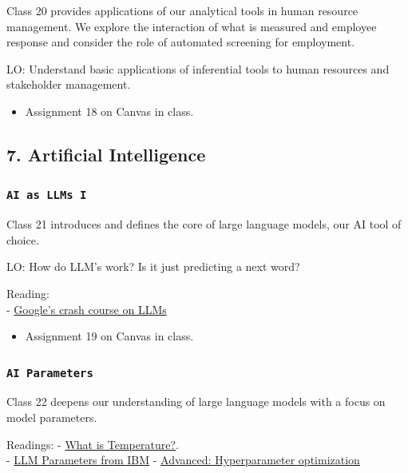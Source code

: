 \documentclass[11pt,]{article}
\begin{document}
Class 20 provides applications of our analytical tools in human resource
management. We explore the interaction of what is measured and employee
response and consider the role of automated screening for employment.

LO: Understand basic applications of inferential tools to human
resources and stakeholder management.

\begin{itemize}
\item Assignment 18 on Canvas in class.
\end{itemize}

\subsection{7. Artificial Intelligence}\label{artificial-intelligence}

\subsubsection{\texorpdfstring{\texttt{AI\ as\ LLMs\ I}}{AI as LLMs I}}\label{ai-as-llms-i}

Class 21 introduces and defines the core of large language models, our
AI tool of choice.

LO: How do LLM's work? Is it just predicting a next word?

Reading:\\
-
\href{https://developers.google.com/machine-learning/crash-course/llm}{Google's
crash course on LLMs}

\begin{itemize}
\item Assignment 19 on Canvas in class.
\end{itemize}

\subsubsection{\texorpdfstring{\texttt{AI\ Parameters}}{AI Parameters}}\label{ai-parameters}

Class 22 deepens our understanding of large language models with a focus
on model parameters.

Readings: -
\href{https://blog.lukesalamone.com/posts/what-is-temperature/}{What is
Temperature?}.\\
- \href{https://www.ibm.com/think/topics/llm-parameters}{LLM Parameters
from IBM} -
\href{https://neptune.ai/blog/hyperparameter-optimization-for-llms}{Advanced:
Hyperparameter optimization}
\end{document}
